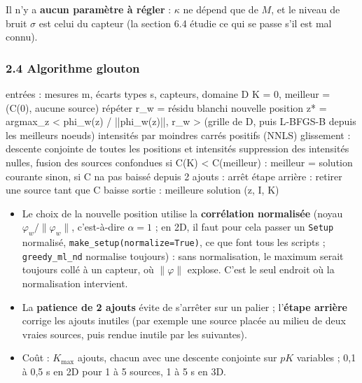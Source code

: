 \documentclass[
  french,
]{article}
\newenvironment{Shaded}{}{}
\newcommand{\NormalTok}[1]{#1}
\providecommand{\tightlist}{%
  \setlength{\itemsep}{0pt}\setlength{\parskip}{0pt}}
\begin{document}
Il n'y a \textbf{aucun paramètre à régler} : \(\kappa\) ne dépend que de
\(M\), et le niveau de bruit \(\sigma\) est celui du capteur (la section
6.4 étudie ce qui se passe s'il est mal connu).

\subsubsection{2.4 Algorithme glouton}\label{algorithme-glouton}

\begin{Shaded}
\begin{Highlighting}[]
\NormalTok{entrées : mesures m, écarts types s, capteurs, domaine D}
\NormalTok{K = 0, meilleur = (C(0), aucune source)}
\NormalTok{répéter}
\NormalTok{    r\_w = résidu blanchi}
\NormalTok{    nouvelle position z* = argmax\_z \textless{} phi\_w(z) / ||phi\_w(z)||, r\_w \textgreater{}}
\NormalTok{                           (grille de D, puis L{-}BFGS{-}B depuis les meilleurs noeuds)}
\NormalTok{    intensités par moindres carrés positifs (NNLS)}
\NormalTok{    glissement : descente conjointe de toutes les positions et intensités}
\NormalTok{    suppression des intensités nulles, fusion des sources confondues}
\NormalTok{    si C(K) \textless{} C(meilleur) : meilleur = solution courante}
\NormalTok{    sinon, si C n\textquotesingle{}a pas baissé depuis 2 ajouts : arrêt}
\NormalTok{étape arrière : retirer une source tant que C baisse}
\NormalTok{sortie : meilleure solution (z, I, K)}
\end{Highlighting}
\end{Shaded}

\begin{itemize}
\tightlist
\item
  Le choix de la nouvelle position utilise la \textbf{corrélation
  normalisée} (noyau \(\varphi_w/\lVert\varphi_w\rVert\), c'est-à-dire
  \(\alpha = 1\) ; en 2D, il faut pour cela passer un \texttt{Setup}
  normalisé, \texttt{make\_setup(normalize=True)}, ce que font tous les
  scripts ; \texttt{greedy\_ml\_nd} normalise toujours) : sans
  normalisation, le maximum serait toujours collé à un capteur, où
  \(\lVert\varphi\rVert\) explose. C'est le seul endroit où la
  normalisation intervient.
\item
  La \textbf{patience de 2 ajouts} évite de s'arrêter sur un palier ;
  l'\textbf{étape arrière} corrige les ajouts inutiles (par exemple une
  source placée au milieu de deux vraies sources, puis rendue inutile
  par les suivantes).
\item
  Coût : \(K_{\max}\) ajouts, chacun avec une descente conjointe sur
  \(pK\) variables ; 0,1 à 0,5 s en 2D pour 1 à 5 sources, 1 à 5 s en
  3D.
\end{itemize}
\end{document}
